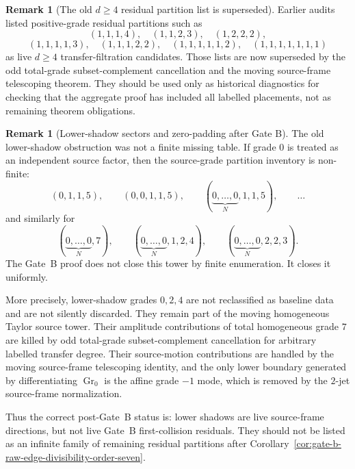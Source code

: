 \documentclass[11pt,a4paper]{amsart}
\theoremstyle{plain}
\theoremstyle{definition}
\newtheorem{remark}[theorem]{Remark}
\begin{document}
\begin{remark}[The old \(d\ge4\) residual partition list is superseded]
\label{rem:old-dge4-residual-list-superseded}
Earlier audits listed positive-grade residual partitions such as
\[
(1,1,1,4),\quad (1,1,2,3),\quad (1,2,2,2),
\]
\[
(1,1,1,1,3),\quad (1,1,1,2,2),\quad
(1,1,1,1,1,2),\quad (1,1,1,1,1,1,1)
\]
as live \(d\ge4\) transfer-filtration candidates.  Those lists are now
superseded by the odd total-grade subset-complement cancellation and the
moving source-frame telescoping theorem.  They should be used only as
historical diagnostics for checking that the aggregate proof has included
all labelled placements, not as remaining theorem obligations.
\end{remark}

\begin{remark}[Lower-shadow sectors and zero-padding after Gate B]
\label{rem:lower-shadow-zero-padding-after-gate-b}
The old lower-shadow obstruction was not a finite missing table.  If
grade \(0\) is treated as an independent source factor, then the
source-grade partition inventory is non-finite:
\[
(0,1,1,5),\qquad
(0,0,1,1,5),\qquad
(\underbrace{0,\ldots,0}_{N},1,1,5),\qquad \ldots
\]
and similarly for
\[
(\underbrace{0,\ldots,0}_{N},7),\qquad
(\underbrace{0,\ldots,0}_{N},1,2,4),\qquad
(\underbrace{0,\ldots,0}_{N},2,2,3).
\]
The Gate~B proof does not close this tower by finite enumeration.  It
closes it uniformly.

More precisely, lower-shadow grades \(0,2,4\) are not reclassified as
baseline data and are not silently discarded.  They remain part of the
moving homogeneous Taylor source tower.  Their amplitude contributions of
total homogeneous grade \(7\) are killed by odd total-grade
subset-complement cancellation for arbitrary labelled transfer degree.
Their source-motion contributions are handled by the moving source-frame
telescoping identity, and the only lower boundary generated by
differentiating \(\operatorname{Gr}_0\) is the affine grade \(-1\) mode,
which is removed by the \(2\)-jet source-frame normalization.

Thus the correct post-Gate~B status is: lower shadows are live
source-frame directions, but not live Gate~B first-collision residuals.
They should not be listed as an infinite family of remaining residual
partitions after
Corollary~\ref{cor:gate-b-raw-edge-divisibility-order-seven}.
\end{remark}
\end{document}
